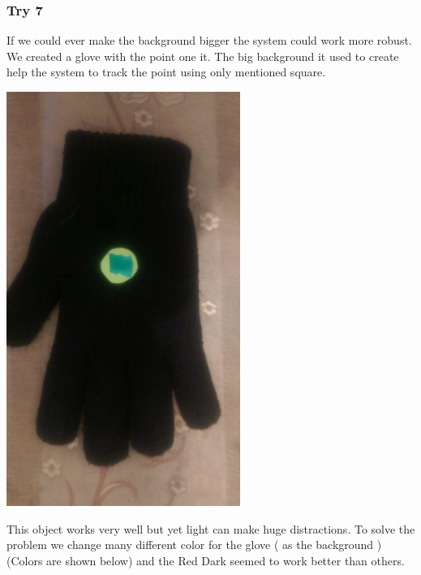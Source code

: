 \documentclass{report}
\begin{document}
\subsubsection{Try 7}
If we could ever make the background bigger the system could work more robust. We created a glove with the point one it. The big background it used to create help the system to track the point using only mentioned square. 
\begin{center}
	\includegraphics[width=3in]{Object7.jpg}
\end{center}
This object works very well but yet light can make huge distractions. To solve the problem we change many different color for the glove ( as the background ) (Colors are shown below) and the Red Dark seemed to work better than others. 
\end{document}
